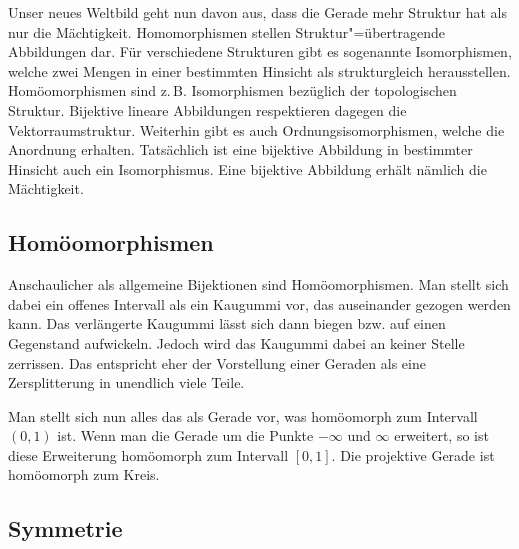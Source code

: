 \documentclass[a4paper,11pt,fleqn,twocolumn,twoside,dvipdfmx]{scrartcl}
\begin{document}
Unser neues Weltbild geht nun davon aus, dass die Gerade mehr
Struktur hat als nur die Mächtigkeit. Homomorphismen stellen
Struktur"=übertragende Abbildungen dar. Für verschiedene Strukturen
gibt es sogenannte Isomorphismen, welche zwei Mengen in einer
bestimmten Hinsicht als strukturgleich herausstellen. Homöomorphismen
sind z.\,B. Isomorphismen bezüglich der topologischen Struktur.
Bijektive lineare Abbildungen respektieren dagegen die
Vektorraumstruktur. Weiterhin gibt es auch Ordnungsisomorphismen,
welche die Anordnung erhalten. Tatsächlich ist eine bijektive
Abbildung in bestimmter Hinsicht auch ein Isomorphismus.
Eine bijektive Abbildung erhält nämlich die Mächtigkeit.


\subsection{Homöomorphismen}

Anschaulicher als allgemeine Bijektionen sind Homöomorphismen. Man
stellt sich dabei ein offenes Intervall als ein Kaugummi vor, das
auseinander gezogen werden kann. Das verlängerte Kaugummi lässt sich
dann biegen bzw. auf einen Gegenstand aufwickeln. Jedoch wird das
Kaugummi dabei an keiner Stelle zerrissen. Das entspricht eher der
Vorstellung einer Geraden als eine Zersplitterung in unendlich
viele Teile.

Man stellt sich nun alles das als Gerade vor, was homöomorph zum
Intervall $(0,1)$ ist. Wenn man die Gerade um die Punkte
$-\infty$ und $\infty$ erweitert, so ist diese Erweiterung
homöomorph zum Intervall $[0,1]$. Die projektive Gerade ist
homöomorph zum Kreis.

\subsection{Symmetrie}
\end{document}
